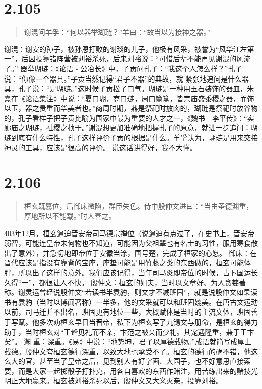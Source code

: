 \documentclass[]{book}
\begin{document}
\section{2.105}\label{section-151}

\begin{quote}
谢混问羊孚：``何以器举瑚琏？''羊曰：``故当以为接神之器。''
\end{quote}

谢混：谢安的孙子，被孙恩打败的谢琰的儿子，他极有风采，被誉为``风华江左第一''，后因投靠错阵营被刘裕杀死，后来刘裕说：``可惜后辈不能再见谢混的风流了。''
器举瑚琏：《论语 -
公冶长》中，子贡问孔子：``我这个人怎么样？''孔子说：``你像一个器具。''子贡当然记得``君子不器''的典故，就
紧张地追问是什么器具，孔子说：``是瑚琏。''这时候子贡松了口气。瑚琏是一种用玉石装饰的器皿，朱熹在《论语集注》中说：``夏曰瑚，商曰琏，周曰簠簋，皆宗庙盛黍稷之器，而饰以玉，器之贵重而华美者也。''商周时期，鼎是祭祀时放肉的，瑚琏是祭祀时放谷物的，孔子看样子把子贡比喻为国家中最为重要的人才之一，《魏书
-
李平传》：``实廊庙之瑚琏，社稷之桢干。''谢混想更加准确地把握孔子的原意，就进一步追问：瑚琏到底有什么特性，孔子这样评价子贡的根据是什么。羊孚认为，瑚琏是用来交接神灵的工具，应该是很高的评价。
说这话讲得好，我不大懂。

\section{2.106}\label{section-152}

\begin{quote}
桓玄既篡位，后御床微陷，群臣失色。侍中殷仲文进曰：``当由圣德渊重，厚地所以不能载。''时人善之。
\end{quote}

403年12月，桓玄逼迫晋安帝司马德宗禅位（说逼迫有点过了，在史书上，晋安帝弱智，可能连皇帝未何物也不知道，可能因为父祖辈也有名士的习性，服用寒食散出了意外），并急切地即帝位于安徽当涂，国号楚，完成了桓家的心愿。
御床：在晋代应该是指没有靠背的宝座，座垫可能是用竹藤之类的东西做的，桓玄可能体胖，所以出了这样的意外。我们应该记得，当年司马炎即帝位的时候，占卜国运长久得``一''，都很让人不快。
殷仲文：桓玄的姐夫，当时以文章好、为人贪婪著称。谢灵运曾经说殷仲文``若读书半袁豹，则文才不减班固''，就是说殷仲文如果读书有袁豹（当时以博闻著称）一半多，他的文采就可以和班固媲美。在唐古文运动以前，司马迁并不出名，班固更有地位一些，大概赋体是当时的主流文体，班固善于写赋。他多次劝桓玄早日当晋帝，私下为桓玄写了九锡文与册命，是桓玄的得力助手，当时桓玄对``王谧见礼而不亲，卞范之被亲而少礼。其宠遇隆重，兼于王卞矣''。
渊
重：深重。《易》中说：``地势坤，君子以厚德载物。''成语就简写成厚土载德。殷仲文夸桓玄德行深重，以致大地也承受不了。桓玄的德行的确不错，他这么大的官，甚至当了皇帝之后，见到别人有好字画、大园子，也不好意思直接索要，而是大家一起掷骰子打扑克，用各自喜欢的东西作赌注，用苦练出来的赌技光明正大地赢来。桓玄被刘裕杀死以后，殷仲文又大义灭亲，投靠刘裕。
\end{document}
